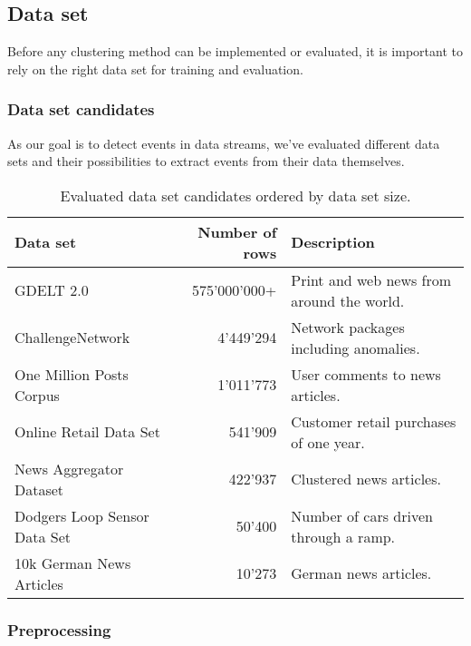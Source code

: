 \subsection{Data set}

Before any clustering method can be implemented or evaluated,
it is important to rely on the right data set for training and evaluation.

\iffalse
As our goal is to detect events in news data streams, we've looked for data sets containing
news articles and if possible, if they're somehow assigned to a \textit{story}.
A story, for example, could be \textit{Brexit}.
Any new news article writing about \textit{Brexit} would be a new event in this story.
\fi

\subsubsection{Data set candidates}
As our goal is to detect events in data streams, we've evaluated different data sets and
their possibilities to extract events from their data themselves.

\begin{table}[h]
    \centering
    \begin{tabular}{|l|r|l|}
    \hline
    \textbf{Data set} & \textbf{Number of rows} & \textbf{Description} \\ \hline
    GDELT 2.0 & 575'000'000+ & Print and web news from around the world. \\ \hline
    ChallengeNetwork & 4'449'294 & Network packages including anomalies. \\ \hline
    One Million Posts Corpus & 1'011'773 & User comments to news articles. \\ \hline
    Online Retail Data Set & 541'909 & Customer retail purchases of one year. \\ \hline
    News Aggregator Dataset & 422'937 & Clustered news articles. \\ \hline
    Dodgers Loop Sensor Data Set & 50'400 & Number of cars driven through a ramp. \\ \hline
    10k German News Articles & 10'273 & German news articles. \\ \hline
    \end{tabular}
    \caption{Evaluated data set candidates ordered by data set size.}
    \label{tab:data_set_candidates}
\end{table}


\subsubsection{Preprocessing}



